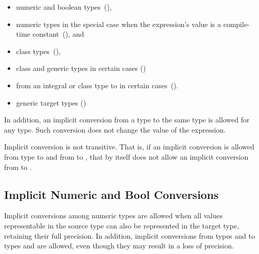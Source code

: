 \begin{itemize}
\item numeric and boolean types~(),
\item numeric types in the special case when the expression's value
      is a compile-time constant~(), and
\item class types~(),
\item class and generic types in certain cases ()
\item from an integral or class type to 
      in certain cases~().
\item generic target types ()
\end{itemize}

In addition,
an implicit conversion from a type to the same type is allowed for any type.
Such conversion does not change the value of the expression.

Implicit conversion is not transitive. That is, if an implicit conversion
is allowed from type  to  and from  to ,
that by itself does not allow an implicit conversion
from  to .

\subsection{Implicit Numeric and Bool Conversions}
\label{Implicit_NumBool_Conversions}

Implicit conversions among numeric types are allowed when
all values representable in the source type can also be represented
in the target type, retaining their full precision.
%
%
In addition, implicit conversions from
types  and  to types 
and  are allowed, even though they may result in a loss of
precision.


